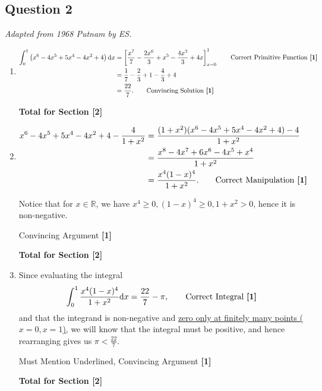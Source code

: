 \documentclass[12pt]{article}
\begin{document}
        \subsection{Question 2}
            \textit{Adapted from 1968 Putnam by ES.}
            \begin{enumerate}
                \item
                    \begin{align*}
                        \int_0^1 \left(x^6 - 4x^5 + 5x^4 - 4x^2 + 4\right) \mathrm{d}x &= \left[\frac{x^7}{7} - \frac{2x^6}{3} + x^5 - \frac{4x^3}{3} + 4x\right]_{x=0}^{1}
                        \tag*{Correct Primitive Function \textbf{[1]}}\\
                        &= \frac{1}{7} - \frac{2}{3} + 1 - \frac{4}{3} + 4\\
                        &= \frac{22}{7}.
                        \tag*{Convincing Solution \textbf{[1]}}
                    \end{align*}

                    \hfill\textbf{Total for Section [2]}
                    
                \item 
                    \begin{align*}
                        x^6 - 4x^5 + 5x^4 - 4x^2 + 4 - \frac{4}{1+x^2} &= \frac{(1+x^2)(x^6 - 4x^5 + 5x^4 - 4x^2 + 4) - 4}{1+x^2}\\
                        &= \frac{x^8 - 4x^7 + 6x^6 - 4x^5 + x^4}{1+x^2}\\
                        &= \frac{x^4 (1-x)^4}{1+x^2}. \tag*{Correct Manipulation \textbf{[1]}}
                    \end{align*}

                    Notice that for \(x \in \mathbb{R}\), we have \(x^4 \geq 0, (1-x)^4 \geq 0, 1 + x^2 > 0\), hence it is non-negative.
                    
                    \hfill{Convincing Argument \textbf{[1]}}
                    
                    \hfill\textbf{Total for Section [2]}
                    
                \item Since evaluating the integral
                    \[
                        \int_0^1 \frac{x^4 (1-x)^4}{1+x^2} \mathrm{d}x = \frac{22}{7} - \pi,  
                        \tag*{Correct Integral \textbf{[1]}}
                    \]
                    and that the integrand is non-negative and \underline{zero only at finitely many points (\(x = 0, x = 1\))}, we will know that the integral must be positive, and hence rearranging gives us \(\pi < \frac{22}{7}\).
                    
                    \hfill{Must Mention Underlined, Convincing Argument \textbf{[1]}}
                    
                    \hfill\textbf{Total for Section [2]}
            \end{enumerate}
            
\end{document}

